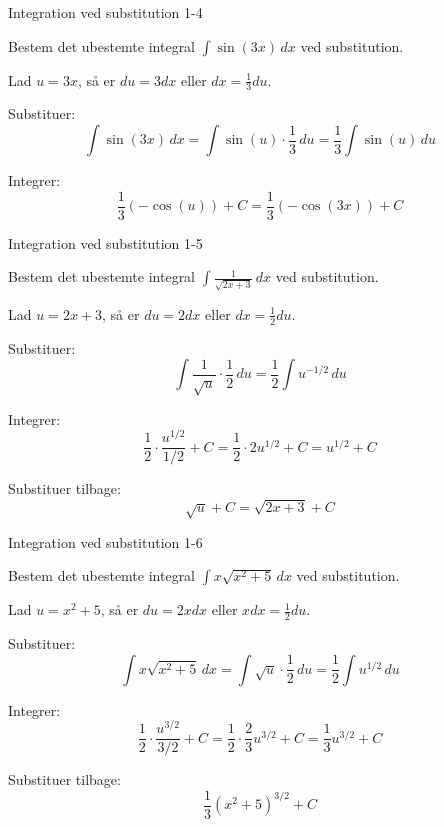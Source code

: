 \documentclass{article}
\begin{document}
\newpage

\begin{exercise}{Integration ved substitution 1-4}

Bestem det ubestemte integral $\int \sin(3x) \, dx$ ved substitution.


\hint

Lad $u = 3x$, så er $du = 3 dx$ eller $dx = \frac{1}{3} du$.

\hint

Substituer:
\[
\int \sin(3x) \, dx = \int \sin(u) \cdot \frac{1}{3} \, du = \frac{1}{3} \int \sin(u) \, du
\]

\hint

Integrer:
\[
\frac{1}{3} (-\cos(u)) + C = \frac{1}{3} (-\cos(3x)) + C 
\]

\end{exercise}

\newpage

\begin{exercise}{Integration ved substitution 1-5}

Bestem det ubestemte integral $\int \frac{1}{\sqrt{2x + 3}} \, dx$ ved substitution.


\hint

Lad $u = 2x + 3$, så er $du = 2 dx$ eller $dx = \frac{1}{2} du$.

\hint

Substituer:
\[
\int \frac{1}{\sqrt{u}} \cdot \frac{1}{2} \, du = \frac{1}{2} \int u^{-1/2} \, du
\]

\hint

Integrer:
\[
\frac{1}{2} \cdot \frac{u^{1/2}}{1/2} + C = \frac{1}{2} \cdot 2u^{1/2} + C = u^{1/2} + C
\]

\hint

Substituer tilbage:
\[
\sqrt{u} + C = \sqrt{2x + 3} + C
\]

\end{exercise}

\newpage

\begin{exercise}{Integration ved substitution 1-6}

Bestem det ubestemte integral $\int x \sqrt{x^2 + 5} \, dx$ ved substitution.


\hint

Lad $u = x^2 + 5$, så er $du = 2x dx$ eller $x dx = \frac{1}{2} du$.

\hint

Substituer:
\[
\int x \sqrt{x^2 + 5} \, dx = \int \sqrt{u} \cdot \frac{1}{2} \, du = \frac{1}{2} \int u^{1/2} \, du
\]

\hint

Integrer:
\[
\frac{1}{2} \cdot \frac{u^{3/2}}{3/2} + C = \frac{1}{2} \cdot \frac{2}{3} u^{3/2} + C = \frac{1}{3} u^{3/2} + C
\]

\hint

Substituer tilbage:
\[
\frac{1}{3}(x^2 + 5)^{3/2} + C
\]

\end{exercise}
\end{document}
